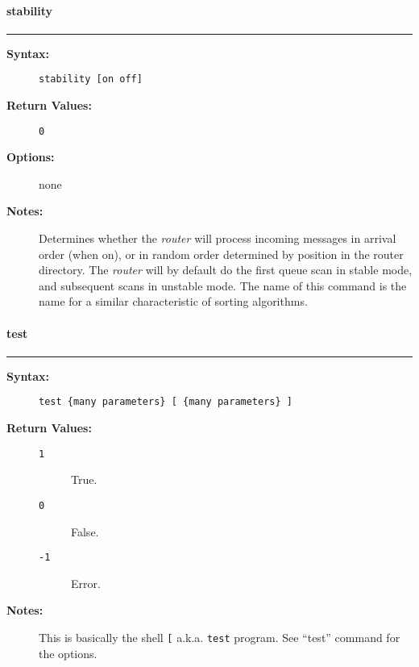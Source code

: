 \vspace {2pt}


\paragraph{stability}

\hrule
\begin{description}
\item[{\bf Syntax:}] \mbox{}

{\tt stability [on {\verbar} off]}

\item[{\bf Return Values:}] \mbox{}

\begin{description}
\item[{\tt 0}] \mbox{}



\end{description}


\item[{\bf Options:}] \mbox{}

none  

\item[{\bf Notes:}] \mbox{}

Determines whether the {\em router\/} will 
process incoming messages in arrival order (when on), or in random 
order determined by position in the router directory. The {\em router\/} 
will by default do the first queue scan in stable mode, and subsequent 
scans in unstable mode. The name of this command is the name for a 
similar characteristic of sorting algorithms. 

\end{description}


\vspace {2pt}


\paragraph{test}

\hrule
\begin{description}
\item[{\bf Syntax:}] \mbox{}

{\tt test \{many parameters\} [ \{many parameters\} ]}

\item[{\bf Return Values:}] \mbox{}

\begin{description}
\item[{\tt 1}] \mbox{}

True.

\item[{\tt 0}] \mbox{}

False.

\item[{\tt -1}] \mbox{}

Error.

\end{description}


\item[{\bf Notes:}] \mbox{}

This is basically the shell {\tt [} a.k.a. 
{\tt test} program. See ``test'' command for the options.

\end{description}


